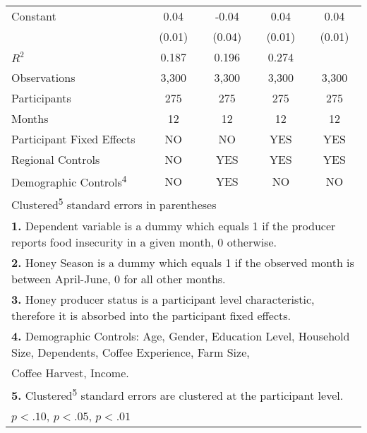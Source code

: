 \begin{table}[htbp]
\begin{tabular}{l*{4}{c}}
\addlinespace
Constant            &        0.04\sym{***}&       -0.04         &        0.04\sym{***}&        0.04\sym{***}\\
                    &      (0.01)         &      (0.04)         &      (0.01)         &      (0.01)         \\
\midrule
\(R^{2}\)           &       0.187         &       0.196         &       0.274         &                     \\
Observations        &       3,300         &       3,300         &       3,300         &       3,300         \\
Participants        &         275         &         275         &         275         &         275         \\
Months              &          12         &          12         &          12         &          12         \\
\hline Participant Fixed Effects&          NO         &          NO         &         YES         &         YES         \\
Regional Controls   &          NO         &         YES         &         YES         &         YES         \\
Demographic Controls\textsuperscript{4}&          NO         &         YES         &          NO         &          NO         \\
\bottomrule
\multicolumn{5}{l}{\footnotesize Clustered\textsuperscript{5} standard errors in parentheses}\\
\multicolumn{5}{l}{\footnotesize \textbf{1.} Dependent variable is a dummy which equals 1 if the producer reports food insecurity in a given month, 0 otherwise.}\\
\multicolumn{5}{l}{\footnotesize \textbf{2.} Honey Season is a dummy which equals 1 if the observed month is between April-June, 0 for all other months.}\\
\multicolumn{5}{l}{\footnotesize \textbf{3.} Honey producer status is a participant level characteristic, therefore it is absorbed into the participant fixed effects.}\\
\multicolumn{5}{l}{\footnotesize \textbf{4.} Demographic Controls: Age, Gender, Education Level, Household Size, Dependents, Coffee Experience, Farm Size,}\\
\multicolumn{5}{l}{\footnotesize Coffee Harvest, Income.}\\
\multicolumn{5}{l}{\footnotesize \textbf{5.} Clustered\textsuperscript{5} standard errors are clustered at the participant level.}\\
\multicolumn{5}{l}{\footnotesize \sym{*} \(p<.10\), \sym{**} \(p<.05\), \sym{***} \(p<.01\)}\\
\end{tabular}
\end{table}
